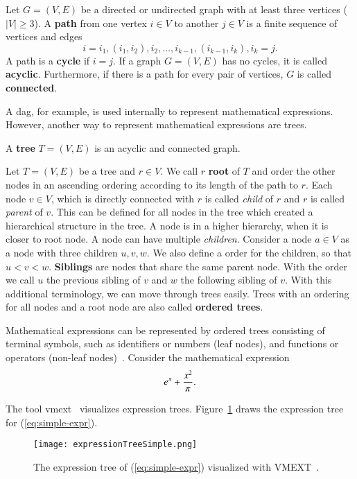 \begin{definition}
Let $G = (V,E)$ be a directed or undirected graph with at least three vertices ($|V| \geq 3$). A \textbf{path} from one vertex $i\in V$ to another $j\in V$ is a finite sequence of vertices and edges
\begin{equation}
i = i_1, (i_1, i_2), i_2, \ldots , i_{k-1}, (i_{k-1}, i_k), i_k = j.
\end{equation}
A path is a \textbf{cycle} if $i = j$. If a graph $G = (V,E)$ has no cycles, it is called \textbf{acyclic}. Furthermore, if there is a path for every pair of vertices, $G$ is called \textbf{connected}.
\end{definition}

A \gls{dag}, for example, is used internally to represent mathematical expressions. However, another way to represent mathematical expressions are trees.

\begin{definition}[Tree]
A \textbf{tree} $T = (V,E)$ is an acyclic and connected graph.
\end{definition}

Let $T = (V,E)$ be a tree and $r \in V$. We call $r$ \textbf{root} of $T$ and order the other nodes in an ascending ordering according to its length of the path to $r$. Each node $v \in V$, which is directly connected with $r$ is called \textit{child} of $r$ and $r$ is called \textit{parent} of $v$. This can be defined for all nodes in the tree which created a hierarchical structure in the tree. A node is in a higher hierarchy, when it is closer to root node. A node can have multiple \textit{children}. Consider a node $a \in V$ as a node with three children $u,v,w$. We also define a order for the children, so that $u < v < w$. \textbf{Siblings} are nodes that share the same parent node. With the order we call $u$ the previous sibling of $v$ and $w$ the following sibling of $v$. With this additional terminology, we can move through trees easily. Trees with an ordering for all nodes and a root node are also called \textbf{ordered trees}.

Mathematical expressions can be represented by ordered trees consisting of terminal symbols, such as identifiers or numbers (leaf nodes), and functions or operators (non-leaf nodes)~\parencite{VMEXT}. Consider the mathematical expression
\begin{equation}\label{eq:simple-expr}
{e}^{x} + \frac{x^2}{{\pi}}.
\end{equation}

The tool \gls{vmext}~\parencite{VMEXT} visualizes expression trees. Figure~\ref{fig:simple-expr-tree} draws the expression tree for (\ref{eq:simple-expr}).

\begin{figure}[ht]
    \centering
    \texttt{[image: expressionTreeSimple.png]}
    \caption{The expression tree of (\ref{eq:simple-expr}) visualized with VMEXT~\parencite{VMEXT}.}
    \label{fig:simple-expr-tree}
\end{figure}